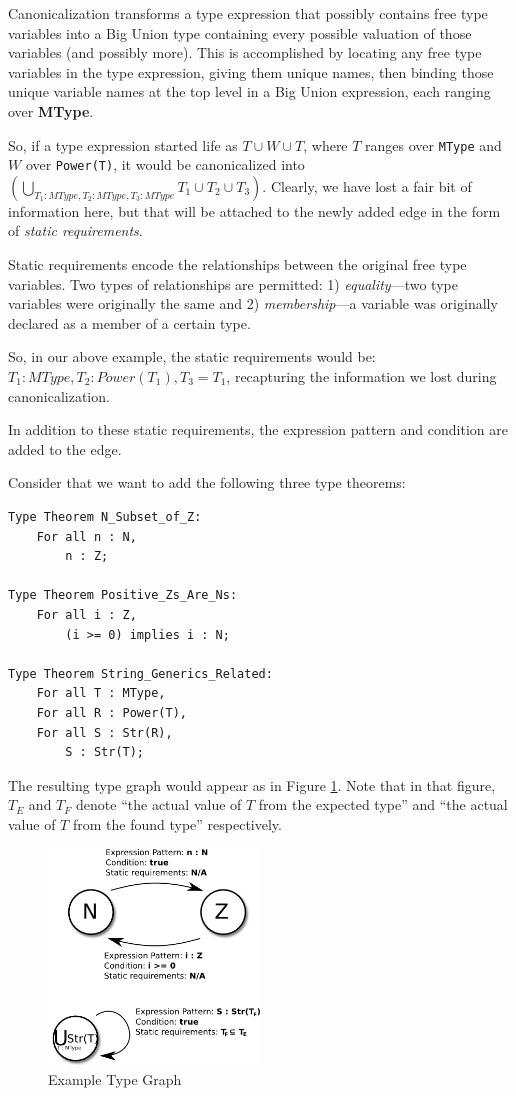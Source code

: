 Canonicalization transforms a type expression that possibly contains free type variables into a Big Union type containing every possible valuation of those variables (and possibly more).  This is accomplished by locating any free type variables in the type expression, giving them unique names, then binding those unique variable names at the top level in a Big Union expression, each ranging over \textbf{MType}.

So, if a type expression started life as $T \cup W \cup T$, where $T$ ranges over \texttt{MType} and $W$ over \texttt{Power(T)}, it would be canonicalized into $\left( \bigcup \limits_{T_1 : MType, T_2 : MType, T_3 : MType} T_1 \cup T_2 \cup T_3 \right)$.  Clearly, we have lost a fair bit of information here, but that will be attached to the newly added edge in the form of \emph{static requirements}.

Static requirements encode the relationships between the original free type variables.  Two types of relationships are permitted: 1) \emph{equality}---two type variables were originally the same and 2) \emph{membership}---a variable was originally declared as a member of a certain type.

So, in our above example, the static requirements would be: $T_1 : MType, T_2 : Power(T_1), T_3 = T_1$, recapturing the information we lost during canonicalization.

In addition to these static requirements, the expression pattern and condition are added to the edge.

Consider that we want to add the following three type theorems:

\begin{lstlisting}
Type Theorem N_Subset_of_Z:
	For all n : N,
		n : Z;

Type Theorem Positive_Zs_Are_Ns:
	For all i : Z,
		(i >= 0) implies i : N;

Type Theorem String_Generics_Related:
	For all T : MType,
	For all R : Power(T),
	For all S : Str(R),
		S : Str(T);
\end{lstlisting}

The resulting type graph would appear as in Figure \ref{typeGraph}.  Note that in that figure, $T_E$ and $T_F$ denote ``the actual value of $T$ from the expected type'' and ``the actual value of $T$ from the found type'' respectively.

\begin{figure}
  \centering
    \includegraphics[width=0.5\textwidth]{typeGraph}
  \caption{Example Type Graph\label{typeGraph}}
\end{figure}

